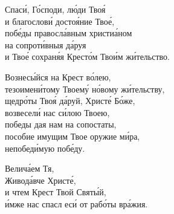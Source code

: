 \documentclass{article}
\begin{document}
%
%
Спаси́, Го́споди, лю́ди Твоя́ \\
и благослови́ достоя́ние Твое́, \\
побе́ды правосла́вным христиа́ном \\
  \cont на сопроти́вныя да́руя \\
и Твое́ сохраня́я Кресто́м Твои́м жи́тельство.

%
Вознесы́йся на Крест во́лею, \\
тезоимени́тому Твоему́ но́вому жи́тельству, \\
щедро́ты Твоя́ да́руй, Христе́ Бо́же, \\
возвесели́ нас си́лою Твоею, \\
победы дая нам на сопостаты, \\
пособие имущим Твое оружие ми́ра, \\
непобеди́мую побе́ду.

%
Велича́ем Тя, \\
Живода́вче Христе́, \\
и чтем Крест Твой Святы́й, \\
и́мже нас спасл еси́ от рабо́ты вра́жия.
\end{document}
